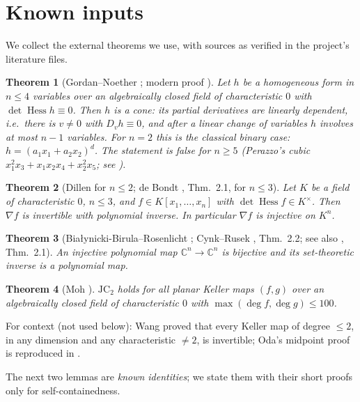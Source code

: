 \documentclass[11pt]{article}
\theoremstyle{plain}
\newtheorem{theorem}{Theorem}[section]
\theoremstyle{definition}
\newcommand{\C}{\mathbb{C}}
\newcommand{\Hess}{\operatorname{Hess}}
\newcommand{\JC}{\mathrm{JC}}
\begin{document}
\section{Known inputs}\label{sec:inputs}

We collect the external theorems we use, with sources as verified in the
project's literature files.

\begin{theorem}[Gordan--Noether \cite{GN}; modern proof
\cite{WdB}]\label{thm:GN}
Let $h$ be a homogeneous form in $n\le4$ variables over an algebraically
closed field of characteristic $0$ with $\det\Hess h\equiv0$. Then $h$ is
a cone: its partial derivatives are linearly dependent, i.e.\ there is
$v\ne0$ with $D_vh\equiv0$, and after a linear change of variables $h$
involves at most $n-1$ variables. For $n=2$ this is the classical binary
case: $h=(a_1x_1+a_2x_2)^d$. The statement is false for $n\ge5$ (Perazzo's
cubic $x_1^2x_3+x_1x_2x_4+x_2^2x_5$; see \cite{WdB}).
\end{theorem}

\begin{theorem}[Dillen \cite{Dillen} for $n\le2$; de Bondt
\cite{deBondt2015}, Thm.~2.1, for $n\le3$]\label{thm:hc3}
Let $K$ be a field of characteristic $0$, $n\le3$, and
$f\in K[x_1,\dots,x_n]$ with $\det\Hess f\in K^{\times}$. Then $\nabla f$
is invertible with polynomial inverse. In particular $\nabla f$ is
injective on $K^n$.
\end{theorem}

\begin{theorem}[Bia{\l}ynicki-Birula--Rosenlicht \cite{BBR}; Cynk--Rusek
\cite{CynkRusek}, Thm.~2.2; see also \cite{BCW}, Thm.~2.1]\label{thm:inj}
An injective polynomial map $\C^n\to\C^n$ is bijective and its
set-theoretic inverse is a polynomial map.
\end{theorem}

\begin{theorem}[Moh \cite{Moh}]\label{thm:moh}
$\JC_2$ holds for all planar Keller maps $(f,g)$ over an algebraically
closed field of characteristic $0$ with $\max(\deg f,\deg g)\le100$.
\end{theorem}

For context (not used below): Wang \cite{Wang} proved that every Keller
map of degree $\le2$, in any dimension and any characteristic $\ne2$, is
invertible; Oda's midpoint proof is reproduced in \cite[Thm.~2.4]{BCW}.

The next two lemmas are \emph{known identities}; we state them with their
short proofs only for self-containedness.
\end{document}
